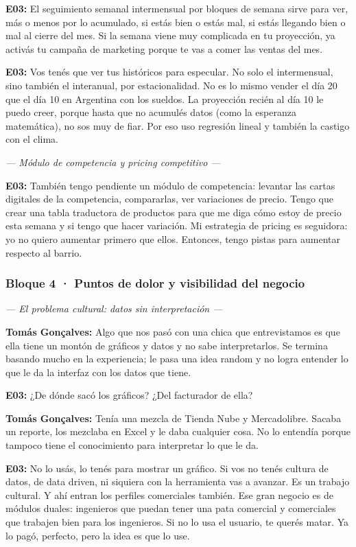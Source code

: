 \noindent\textbf{E03:} El seguimiento semanal intermensual por bloques de semana sirve para ver, más o menos por lo acumulado, si estás bien o estás mal, si estás llegando bien o mal al cierre del mes. Si la semana viene muy complicada en tu proyección, ya activás tu campaña de marketing porque te vas a comer las ventas del mes.

\noindent\textbf{E03:} Vos tenés que ver tus históricos para especular. No solo el intermensual, sino también el interanual, por estacionalidad. No es lo mismo vender el día 20 que el día 10 en Argentina con los sueldos. La proyección recién al día 10 le puedo creer, porque hasta que no acumulés datos (como la esperanza matemática), no sos muy de fiar. Por eso uso regresión lineal y también la castigo con el clima.

\noindent\textit{--- Módulo de competencia y pricing competitivo ---}

\noindent\textbf{E03:} También tengo pendiente un módulo de competencia: levantar las cartas digitales de la competencia, compararlas, ver variaciones de precio. Tengo que crear una tabla traductora de productos para que me diga cómo estoy de precio esta semana y si tengo que hacer variación. Mi estrategia de pricing es seguidora: yo no quiero aumentar primero que ellos. Entonces, tengo pistas para aumentar respecto al barrio.

\subsubsection*{Bloque 4 · Puntos de dolor y visibilidad del negocio}

\noindent\textit{--- El problema cultural: datos sin interpretación ---}

\noindent\textbf{Tomás Gonçalves:} Algo que nos pasó con una chica que entrevistamos es que ella tiene un montón de gráficos y datos y no sabe interpretarlos. Se termina basando mucho en la experiencia; le pasa una idea random y no logra entender lo que le da la interfaz con los datos que tiene.

\noindent\textbf{E03:} ¿De dónde sacó los gráficos? ¿Del facturador de ella?

\noindent\textbf{Tomás Gonçalves:} Tenía una mezcla de Tienda Nube y Mercadolibre. Sacaba un reporte, los mezclaba en Excel y le daba cualquier cosa. No lo entendía porque tampoco tiene el conocimiento para interpretar lo que le da.

\noindent\textbf{E03:} No lo usás, lo tenés para mostrar un gráfico. Si vos no tenés cultura de datos, de data driven, ni siquiera con la herramienta vas a avanzar. Es un trabajo cultural. Y ahí entran los perfiles comerciales también. Ese gran negocio es de módulos duales: ingenieros que puedan tener una pata comercial y comerciales que trabajen bien para los ingenieros. Si no lo usa el usuario, te querés matar. Ya lo pagó, perfecto, pero la idea es que lo use.

